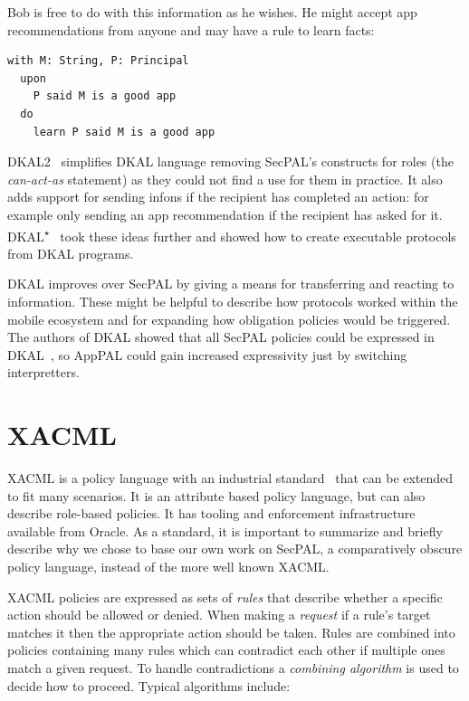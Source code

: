 \documentclass[thesis.tex]{subfiles}
\begin{document}
Bob is free to do with this information as he wishes. He might accept app
recommendations from anyone and may have a rule to learn facts:

\begin{lstlisting}
with M: String, P: Principal
  upon
    P said M is a good app
  do
    learn P said M is a good app
\end{lstlisting}

DKAL2~\cite{yuri_gurevich_dkal2---simplified_2009} simplifies DKAL
language removing SecPAL's constructs for roles (the \emph{can-act-as} statement)
as they could not find a use for them in practice.  It also adds
support for sending infons if the recipient has completed an action:
for example only sending an app recommendation if the recipient has
asked for it.
DKAL\textsuperscript{$\star$}~\cite{jeannin_dkal*:_2013} took these
ideas further and showed how to create executable protocols from DKAL programs.

DKAL improves over SecPAL by giving a means for transferring and reacting to
information. These might be helpful to describe how protocols worked within the
mobile ecosystem and for expanding how obligation policies would be triggered.
The authors of DKAL showed that all SecPAL policies could be expressed in
DKAL~\cite{gurevich_dkal:_2008}, so AppPAL could gain increased expressivity
just by switching interpretters.

\section{XACML}

XACML is a policy language with an industrial
standard~\cite{oasis_extensible_2013} that can be extended to fit many
scenarios. It is an attribute based policy language, but can also describe
role-based policies. It has tooling and enforcement infrastructure available
from Oracle. As a standard, it is important to summarize and briefly describe
why we chose to base our own work on SecPAL, a comparatively obscure policy
language, instead of the more well known XACML.

XACML policies are expressed as sets of \emph{rules} that describe whether a
specific action should be allowed or denied. When making a \emph{request} if a
rule's target matches it then the appropriate action should be taken. Rules are
combined into policies containing many rules which can contradict each other if
multiple ones match a given request. To handle contradictions a \emph{combining
algorithm} is used to decide how to proceed. Typical algorithms include:
\end{document}
